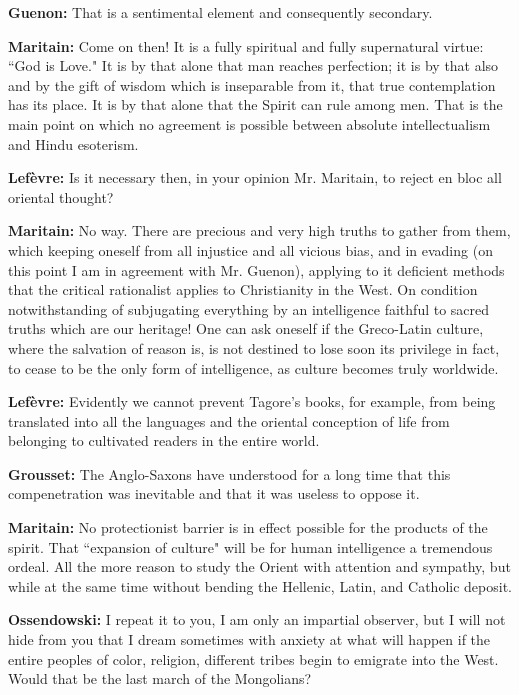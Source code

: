 \textbf{Guenon:} That is a sentimental element and consequently secondary.

\textbf{Maritain:} Come on then! It is a fully spiritual and fully supernatural virtue: ``God is Love." It is by that alone that man reaches perfection; it is by that also and by the gift of wisdom which is inseparable from it, that true contemplation has its place. It is by that alone that the Spirit can rule among men. That is the main point on which no agreement is possible between absolute intellectualism and Hindu esoterism.

\textbf{Lefèvre:} Is it necessary then, in your opinion Mr. Maritain, to reject en bloc all oriental thought?

\textbf{Maritain:} No way. There are precious and very high truths to gather from them, which keeping oneself from all injustice and all vicious bias, and in evading (on this point I am in agreement with Mr. Guenon), applying to it deficient methods that the critical rationalist applies to Christianity in the West. On condition notwithstanding of subjugating everything by an intelligence faithful to sacred truths which are our heritage! One can ask oneself if the Greco-Latin culture, where the salvation of reason is, is not destined to lose soon its privilege in fact, to cease to be the only form of intelligence, as culture becomes truly worldwide.

\textbf{Lefèvre:} Evidently we cannot prevent Tagore's books, for example, from being translated into all the languages and the oriental conception of life from belonging to cultivated readers in the entire world.

\textbf{Grousset:} The Anglo-Saxons have understood for a long time that this compenetration was inevitable and that it was useless to oppose it.

\textbf{Maritain:} No protectionist barrier is in effect possible for the products of the spirit. That ``expansion of culture" will be for human intelligence a tremendous ordeal. All the more reason to study the Orient with attention and sympathy, but while at the same time without bending the Hellenic, Latin, and Catholic deposit.

\textbf{Ossendowski:} I repeat it to you, I am only an impartial observer, but I will not hide from you that I dream sometimes with anxiety at what will happen if the entire peoples of color, religion, different tribes begin to emigrate into the West. Would that be the last march of the Mongolians?



